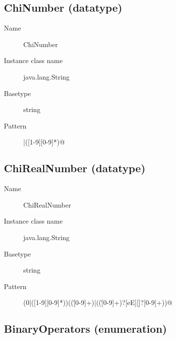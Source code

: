 \subsection{ChiNumber (datatype)}\label{chiclass:ChiNumber}
\dtypedocuChiNumber

\begin{description}
\item[Name] ChiNumber
\item[Instance class name] java.lang.String
\item[Basetype] string
\item[Pattern] |([1-9][0-9]*)@
\end{description}

\subsection{ChiRealNumber (datatype)}\label{chiclass:ChiRealNumber}
\dtypedocuChiRealNumber

\begin{description}
\item[Name] ChiRealNumber
\item[Instance class name] java.lang.String
\item[Basetype] string
\item[Pattern] \verb@(0|([1-9][0-9]*))((\.[0-9]+)|((\.[0-9]+)?[eE][\-\+]?[0-9]+))@
\end{description}

\subsection{BinaryOperators (enumeration)}\label{chiclass:BinaryOperators}
\enumdocuBinaryOperators

